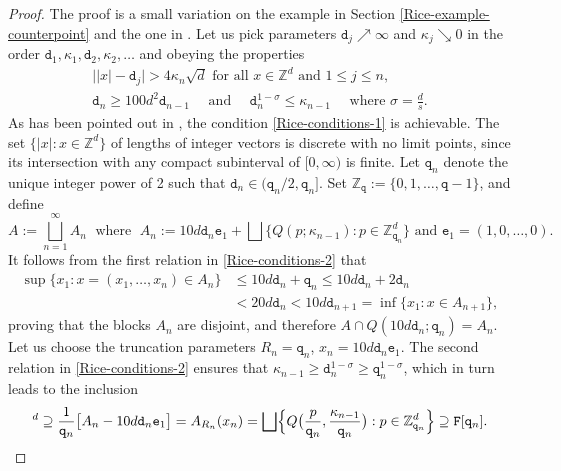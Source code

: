 \documentclass[a4paper,11pt]{amsart}
\numberwithin{equation}{section}
\begin{document}
\begin{proof} 
The proof is a small variation on the example in Section \ref{Rice-example-counterpoint} and the one in \cite{2020Rice}. Let us pick parameters $\mathtt d_j \nearrow \infty$ and $\kappa_j \searrow 0$ in the order $\mathtt d_1, \kappa_1, \mathtt d_2, \kappa_2, \ldots$ and obeying the properties
\begin{align} 
 \bigl| |x| - \mathtt d_j \bigr| > 4\kappa_n \sqrt{d} \text{ for all $x \in \mathbb Z^d$ and } 1 \leq j \leq n,  \label{Rice-conditions-1} \\ \mathtt d_n \geq 100d^2 \mathtt d_{n-1} \quad \text{ and } \quad \mathtt d_{n}^{1 - \sigma} \leq \mathtt \kappa_{n-1} \quad \text{ where } \sigma = \frac{d}{s}.  \label{Rice-conditions-2} \end{align}  
As has been pointed out in \cite{2020Rice}, the condition \eqref{Rice-conditions-1} is achievable. The set $\{|x| : x \in \mathbb Z^d\}$ of lengths of integer vectors is discrete with no limit points, since its intersection with any compact subinterval of $[0, \infty)$  is finite. Let $\mathtt q_n$ denote the unique integer power of 2 such that $\mathtt d_n \in (\mathtt q_n/2, \mathtt q_n]$. Set $\mathbb Z_{\mathtt q} := \{0, 1, \ldots, \mathtt q -1\}$, and define 
\[ A := \bigsqcup_{n=1}^{\infty} A_n \; \text{ where } \; A_n := 10d \mathtt d_n \mathtt e_1 + \bigsqcup \bigl\{ Q(p; \kappa_{n-1}) : p \in \mathbb Z_{\mathtt q_n}^d \bigr\} \text{ and } \mathtt e_1= (1, 0, \ldots, 0). \]  
It follows from the first relation in \eqref{Rice-conditions-2} that 
\begin{align*} \sup\{x_1 : x = (x_1, \ldots, x_n) \in A_n \} &\leq 10d \mathtt d_n + \mathtt q_n \leq 10d \mathtt d_n + 2 \mathtt d_n \\ &< 20 d \mathtt d_n < 10 d \mathtt d_{n+1} = \inf\{x_1 : x \in A_{n+1} \} , 
\end{align*}  
proving that the blocks $A_n$ are disjoint, and therefore $A \cap Q(10d\mathtt d_n; \mathtt q_n) = A_n$.  Let us choose the truncation parameters $R_n = \mathtt q_n$, $x_n = 10d\mathtt d_n\mathtt e_1$. The second relation in \eqref{Rice-conditions-2} ensures that $\kappa_{n-1} \geq \mathtt d_n^{1 - \sigma} \geq \mathtt q_n^{1-\sigma}$, which in turn leads to the inclusion 
\begin{equation*} 
[0,1]^d \supseteq \frac{1}{\mathtt q_n} \big[A_{n} - 10d\mathtt d_n \mathtt e_1 \bigr] = A_{R_n}(x_n) 
= \bigsqcup \Bigl\{Q \bigl(\frac{p}{\mathtt q_n}, \frac{\kappa_{n-1}}{\mathtt q_n} \bigr) : p \in \mathbb Z_{\mathtt q_n}^d \Bigr\} \supseteq \mathtt F[\mathtt q_n].

\end{equation*}
\end{proof}
\end{document}
